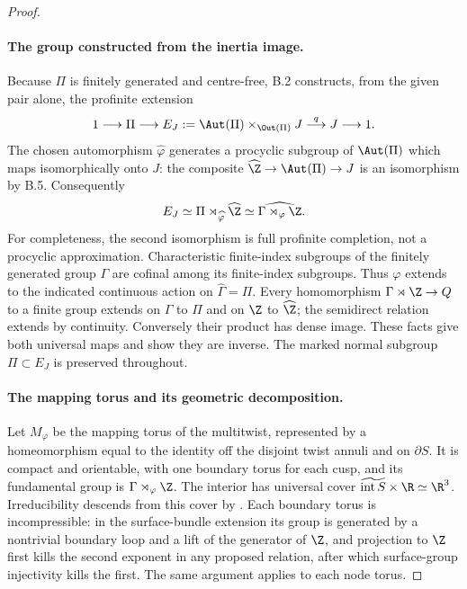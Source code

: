 \begin{proof}
\paragraph{The group constructed from the inertia image.}
Because $\Pi$ is finitely generated and centre-free, B.2 constructs,
from the given pair alone, the profinite extension
\[
 1\longrightarrow\Pi\longrightarrow
 E_J:=\Aut(\Pi)\times_{\Out(\Pi)}J
 \stackrel{q}{\longrightarrow}J\longrightarrow1.
\]
The chosen automorphism $\widehat\varphi$ generates a procyclic
subgroup of $\Aut(\Pi)$ which maps isomorphically onto $J$:
the composite $\widehat\Z\to\Aut(\Pi)\to J$ is an isomorphism
by B.5. Consequently
\[
 E_J\simeq\Pi\rtimes_{\widehat\varphi}\widehat\Z
       \simeq\widehat{\Gamma\rtimes_{\varphi}\Z}.
\]
For completeness, the second isomorphism is full profinite completion,
not a procyclic approximation. Characteristic finite-index subgroups
of the finitely generated group $\Gamma$ are cofinal among its
finite-index subgroups. Thus $\varphi$ extends to the indicated
continuous action on $\widehat\Gamma=\Pi$. Every homomorphism
$\Gamma\rtimes\Z\to Q$ to a finite group extends on $\Gamma$ to
$\Pi$ and on $\Z$ to $\widehat\Z$; the semidirect relation extends
by continuity. Conversely their product has dense image. These facts
give both universal maps and show they are inverse. The marked normal
subgroup $\Pi\subset E_J$ is preserved throughout.

\paragraph{The mapping torus and its geometric decomposition.}
Let $M_\varphi$ be the mapping torus of the multitwist, represented by a
homeomorphism equal to the identity off the disjoint twist annuli and on
$\partial S$. It is compact and orientable, with one boundary torus
for each cusp, and its fundamental group is
$\Gamma\rtimes_\varphi\Z$. The interior has universal cover
$\widetilde{\operatorname{int}S}\times\R\simeq\R^3$.
Irreducibility descends from this cover by
\citet[Proposition 1.6]{BC_Hatcher3M}. Each boundary torus is
incompressible: in the surface-bundle extension its group is generated
by a nontrivial boundary loop and a lift of the generator of $\Z$,
and projection to $\Z$ first kills the second exponent in any proposed
relation, after which surface-group injectivity kills the first.
The same argument applies to each node torus.


\end{proof}
